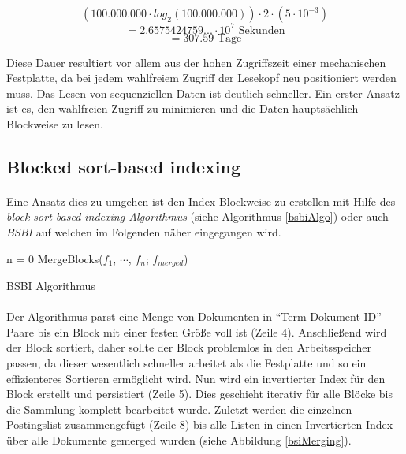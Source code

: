 \[(100.000.000 \cdot log_2 (100.000.000)) \cdot 2 \cdot (5 \cdot 10^{-3}) \]
\[ = 2.6575424759... \cdot 10^7 \text{ Sekunden}\]
\[ = 307.59 \text{ Tage} \]

Diese Dauer resultiert vor allem aus der hohen Zugriffszeit einer mechanischen Festplatte, da bei jedem wahlfreiem Zugriff der Lesekopf neu positioniert werden muss. Das Lesen von sequenziellen Daten ist deutlich schneller. Ein erster Ansatz ist es, den wahlfreien Zugriff zu minimieren und die Daten hauptsächlich Blockweise zu lesen.
\par

\subsection{Blocked sort-based indexing}
\paragraph{}
Eine Ansatz dies zu umgehen ist den Index Blockweise zu erstellen mit Hilfe des \textit{block sort-based indexing Algorithmus} (siehe Algorithmus \ref{bsbiAlgo}) oder auch \textit{BSBI} auf welchen im Folgenden näher eingegangen wird.
\par
\begin{algorithm}
 n = 0\;
  MergeBlocks($f_1$, $\cdots$, $f_n$; $f_{merged}$)\;
\caption{BSBI Algorithmus} \label{bsbiAlgo}
\end{algorithm}

\paragraph{}
Der Algorithmus parst eine Menge von Dokumenten in \enquote{Term-Dokument ID} Paare bis ein Block mit einer festen Größe voll ist (Zeile 4). Anschließend wird der Block sortiert, daher sollte der Block problemlos in den Arbeitsspeicher passen, da dieser wesentlich schneller arbeitet als die Festplatte und so ein effizienteres Sortieren ermöglicht wird. Nun wird ein invertierter Index für den Block erstellt und persistiert (Zeile 5). Dies geschieht iterativ für alle Blöcke bis die Sammlung komplett bearbeitet wurde. Zuletzt werden die einzelnen Postingslist zusammengefügt (Zeile 8) bis alle Listen in einen Invertierten Index über alle Dokumente gemerged wurden (siehe Abbildung \ref{bsiMerging}). 
\par

